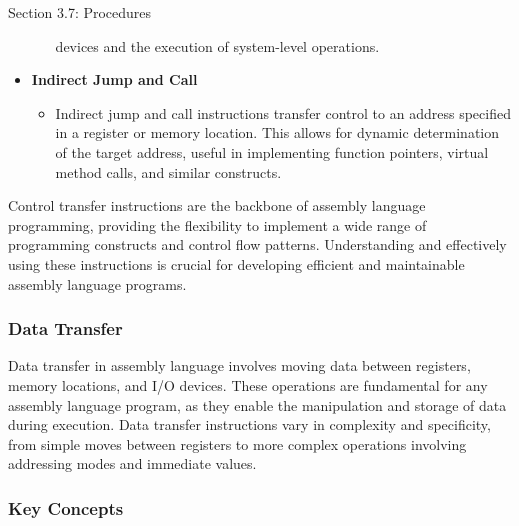 \begin{notes}{Section 3.7: Procedures}
\begin{itemize}
\begin{itemize}
            devices and the execution of system-level operations.
        \end{itemize}
        \item \textbf{Indirect Jump and Call}
        \begin{itemize}
            \item Indirect jump and call instructions transfer control to an address specified in a register or memory location. This allows for dynamic determination of the target address, useful 
            in implementing function pointers, virtual method calls, and similar constructs.
        \end{itemize}
    \end{itemize}
    
    Control transfer instructions are the backbone of assembly language programming, providing the flexibility to implement a wide range of programming constructs and control flow patterns. Understanding 
    and effectively using these instructions is crucial for developing efficient and maintainable assembly language programs.
    
    \subsubsection*{Data Transfer}

    Data transfer in assembly language involves moving data between registers, memory locations, and I/O devices. These operations are fundamental for any assembly language program, as they enable 
    the manipulation and storage of data during execution. Data transfer instructions vary in complexity and specificity, from simple moves between registers to more complex operations involving 
    addressing modes and immediate values.
    
    \subsubsection*{Key Concepts}
    

\end{notes}

